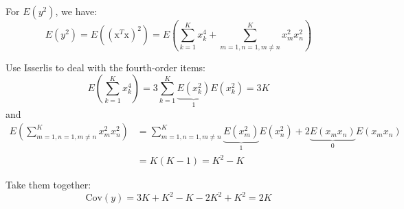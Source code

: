 \documentclass[10pt]{article}
\begin{document}
For $E(y^2)$, we have:
\begin{equation}
E\left( {{y^2}} \right) = E\left( {{{\left( {{\mathrm{x}^T}\mathrm{x}} \right)}^2}} \right) = E\left( {\sum\limits_{k = 1}^K {x_k^4}  + \sum\limits_{m = 1,n = 1,m \ne n}^K {x_m^2x_n^2} } \right)
\end{equation}

Use Isserlis to deal with the fourth-order items:
\begin{equation}
E\left( {\sum\limits_{k = 1}^K {x_k^4} } \right) = 3\sum\limits_{k = 1}^K {\underbrace {E\left( {x_k^2} \right)}_1E\left( {x_k^2} \right)}  = 3K
\end{equation}
and
\begin{equation}
\begin{split}
E\left( {\sum\limits_{m = 1,n = 1,m \ne n}^K {x_m^2x_n^2} } \right) &= \sum\limits_{m = 1,n = 1,m \ne n}^K {\underbrace {E\left( {x_m^2} \right)}_1E\left( {x_n^2} \right) + 2\underbrace {E\left( {{x_m}{x_n}} \right)}_0E\left( {{x_m}{x_n}} \right)} \\
&= K\left( {K - 1} \right) = {K^2} - K
\end{split}
\end{equation}

Take them together:
\begin{equation}
\mathrm{Cov}\left( y \right) = 3K + {K^2} - K - 2{K^2} + {K^2} = 2K
\end{equation}
\end{document}
